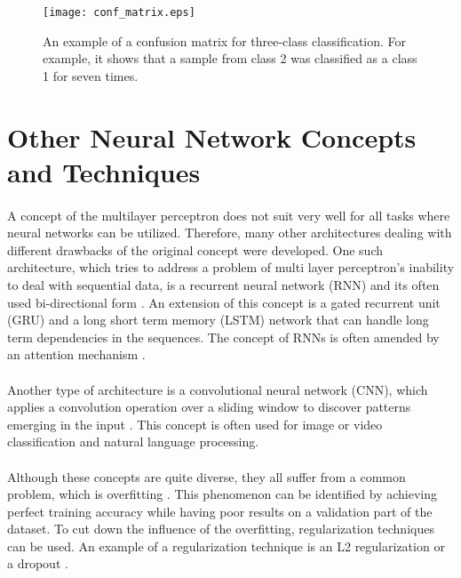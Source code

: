 \begin{figure}[!h]
	\texttt{[image: conf\_matrix.eps]}
	\centering
	\caption{An example of a confusion matrix for three-class classification. For example, it shows that a sample from class 2 was classified as a class 1 for seven times.}
	\label{conf_matrix_example}
\end{figure}

\section{Other Neural Network Concepts and Techniques}\label{other_nn_architectrues_and_techniques}
\paragraph{}
A concept of the multilayer perceptron does not suit very well for all tasks where neural networks can be utilized. Therefore, many other architectures dealing with different drawbacks of the original concept were developed. One such architecture, which tries to address a problem of multi layer perceptron's inability to deal with sequential data, is a recurrent neural network (RNN) \cite{RNN_LSTM} and its often used bi-directional form \cite{RNN_LSTM}. An extension of this concept is a gated recurrent unit (GRU) and a long short term memory (LSTM)\cite{colahs_lstm} network that can handle long term dependencies in the sequences. The concept of RNNs is often amended by an attention mechanism  \cite{colahs_attention}.

\paragraph{}
Another type of architecture is a convolutional neural network (CNN), which applies a convolution operation over a sliding window to discover patterns emerging in the input \cite{python_ml_2nd}. This concept is often used for image or video classification and natural language processing. 

\paragraph{}
Although these concepts are quite diverse, they all suffer from a common problem, which is overfitting \cite{Nielsen}. This phenomenon can be identified by achieving perfect training accuracy while having poor results on a validation part of the dataset. To cut down the influence of the overfitting, regularization techniques can be used. An example of a regularization technique is an L2 regularization \cite{Nielsen} or a dropout \cite{droupout_in_cnns}.

